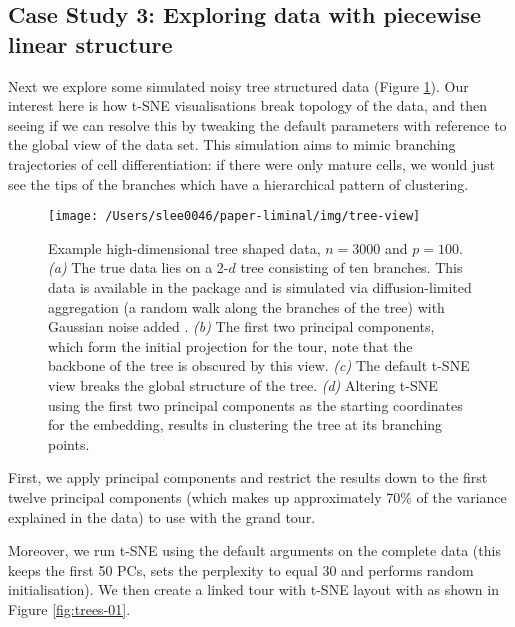 \documentclass[article,notitle]{jdssv}
\begin{document}
\hypertarget{case-study-3-exploring-data-with-piecewise-linear-structure}{%
\subsection{Case Study 3: Exploring data with piecewise linear structure}\label{case-study-3-exploring-data-with-piecewise-linear-structure}}

Next we explore some simulated noisy tree structured data (Figure
\ref{fig:fake-trees}). Our interest here is how t-SNE visualisations break
topology of the data, and then seeing if we can resolve this by tweaking the
default parameters with reference to the global view of the data set.
This simulation aims to mimic branching trajectories of cell differentiation:
if there were only mature cells, we would just see the tips of the branches
which have a hierarchical pattern of clustering.



\begin{figure}

{\centering \texttt{[image: /Users/slee0046/paper-liminal/img/tree-view]} 

}

\caption{Example high-dimensional tree shaped data, \(n = 3000\) and \(p = 100\). \emph{(a)} The true data lies on a 2-\(d\) tree consisting of ten branches. This data is available in the  package and is simulated via diffusion-limited aggregation (a random walk along the branches of the tree) with Gaussian noise added \citep{Moon2019-ce}. \emph{(b)} The first two principal components, which form the initial projection for the tour, note that the backbone of the tree is obscured by this view. \emph{(c)} The default t-SNE view breaks the global structure of the tree. \emph{(d)} Altering t-SNE using the first two principal components as the starting coordinates for the embedding, results in clustering the tree at its branching points.}\label{fig:fake-trees}
\end{figure}

First, we apply principal components and restrict the results down to the first
twelve principal components (which makes up approximately 70\% of the variance
explained in the data) to use with the grand tour.

Moreover, we run t-SNE using the default arguments on the complete data (this
keeps the first 50 PCs, sets the perplexity to equal 30 and performs random
initialisation). We then create a linked
tour with t-SNE layout with  as shown in Figure \ref{fig:trees-01}.
\end{document}
